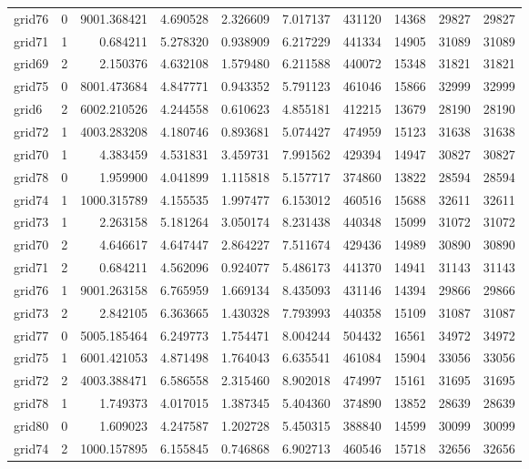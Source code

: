 \begin{longtable}{|l|r|r|r|r|r|r|r|r|r|}
grid76 & 0 & 9001.368421 & 4.690528 & 2.326609 & 7.017137 & 431120 & 14368 & 29827 & 29827 \\
grid71 & 1 & 0.684211 & 5.278320 & 0.938909 & 6.217229 & 441334 & 14905 & 31089 & 31089 \\
grid69 & 2 & 2.150376 & 4.632108 & 1.579480 & 6.211588 & 440072 & 15348 & 31821 & 31821 \\
grid75 & 0 & 8001.473684 & 4.847771 & 0.943352 & 5.791123 & 461046 & 15866 & 32999 & 32999 \\
grid6 & 2 & 6002.210526 & 4.244558 & 0.610623 & 4.855181 & 412215 & 13679 & 28190 & 28190 \\
grid72 & 1 & 4003.283208 & 4.180746 & 0.893681 & 5.074427 & 474959 & 15123 & 31638 & 31638 \\
grid70 & 1 & 4.383459 & 4.531831 & 3.459731 & 7.991562 & 429394 & 14947 & 30827 & 30827 \\
grid78 & 0 & 1.959900 & 4.041899 & 1.115818 & 5.157717 & 374860 & 13822 & 28594 & 28594 \\
grid74 & 1 & 1000.315789 & 4.155535 & 1.997477 & 6.153012 & 460516 & 15688 & 32611 & 32611 \\
grid73 & 1 & 2.263158 & 5.181264 & 3.050174 & 8.231438 & 440348 & 15099 & 31072 & 31072 \\
grid70 & 2 & 4.646617 & 4.647447 & 2.864227 & 7.511674 & 429436 & 14989 & 30890 & 30890 \\
grid71 & 2 & 0.684211 & 4.562096 & 0.924077 & 5.486173 & 441370 & 14941 & 31143 & 31143 \\
grid76 & 1 & 9001.263158 & 6.765959 & 1.669134 & 8.435093 & 431146 & 14394 & 29866 & 29866 \\
grid73 & 2 & 2.842105 & 6.363665 & 1.430328 & 7.793993 & 440358 & 15109 & 31087 & 31087 \\
grid77 & 0 & 5005.185464 & 6.249773 & 1.754471 & 8.004244 & 504432 & 16561 & 34972 & 34972 \\
grid75 & 1 & 6001.421053 & 4.871498 & 1.764043 & 6.635541 & 461084 & 15904 & 33056 & 33056 \\
grid72 & 2 & 4003.388471 & 6.586558 & 2.315460 & 8.902018 & 474997 & 15161 & 31695 & 31695 \\
grid78 & 1 & 1.749373 & 4.017015 & 1.387345 & 5.404360 & 374890 & 13852 & 28639 & 28639 \\
grid80 & 0 & 1.609023 & 4.247587 & 1.202728 & 5.450315 & 388840 & 14599 & 30099 & 30099 \\
grid74 & 2 & 1000.157895 & 6.155845 & 0.746868 & 6.902713 & 460546 & 15718 & 32656 & 32656 \\

\end{longtable}
